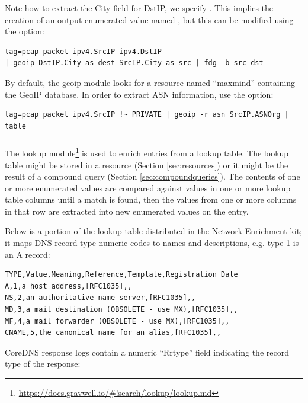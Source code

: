 Note how to extract the City field for DstIP, we specify . This implies the creation of an output enumerated value named , but this can be modified using the  option:

\begin{verbatim}
tag=pcap packet ipv4.SrcIP ipv4.DstIP 
| geoip DstIP.City as dest SrcIP.City as src | fdg -b src dst
\end{verbatim}

By default, the geoip module looks for a resource named ``maxmind'' containing the GeoIP database. In order to extract ASN information, use the  option:

\begin{verbatim}
tag=pcap packet ipv4.SrcIP !~ PRIVATE | geoip -r asn SrcIP.ASNOrg | table
\end{verbatim}

\subsubsection{\emph{}}

The lookup module\footnote{\href{https://docs.gravwell.io/\#!search/lookup/lookup.md}{https://docs.gravwell.io/\#!search/lookup/lookup.md}} is used to enrich entries from a lookup table. The lookup table might be stored in a resource (Section \ref{sec:resources}) or it might be the result of a compound query (Section \ref{sec:compoundqueries}). The contents of one or more enumerated values are compared against values in one or more lookup table columns until a match is found, then the values from one or more columns in that row are extracted into new enumerated values on the entry.

Below is a portion of the  lookup table distributed in the Network Enrichment kit; it maps DNS record type numeric codes to names and descriptions, e.g. type 1 is an A record:

\begin{verbatim}
TYPE,Value,Meaning,Reference,Template,Registration Date
A,1,a host address,[RFC1035],,
NS,2,an authoritative name server,[RFC1035],,
MD,3,a mail destination (OBSOLETE - use MX),[RFC1035],,
MF,4,a mail forwarder (OBSOLETE - use MX),[RFC1035],,
CNAME,5,the canonical name for an alias,[RFC1035],,
\end{verbatim}

CoreDNS response logs contain a numeric ``Rrtype'' field indicating the record type of the response:

